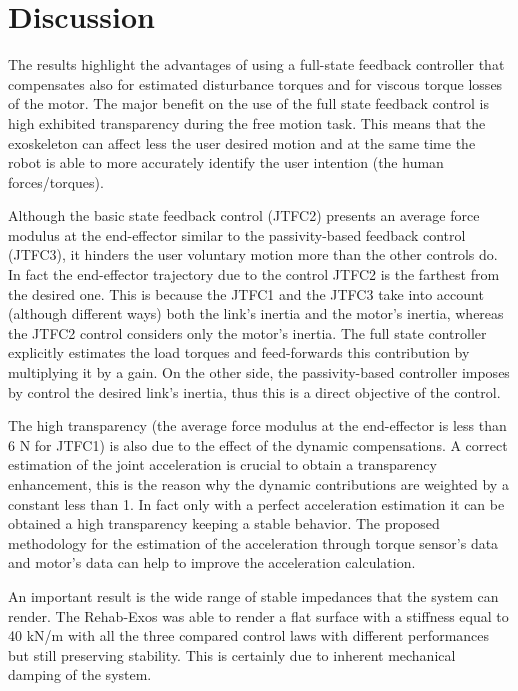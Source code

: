 
\section{Discussion} \label{sec:discussion}

The results highlight the advantages of using a full-state feedback controller that compensates also for estimated disturbance torques and for viscous torque losses of the motor. The major benefit on the use of the full state feedback control is high exhibited transparency during the free motion task. This means that the exoskeleton can affect less the user desired motion and at the same time the robot is able to more accurately identify the user intention (the human forces/torques).
\par Although the basic state feedback control (JTFC2) presents an average force modulus at the end-effector similar to the passivity-based feedback control (JTFC3), it hinders the user voluntary motion more than the other controls do. In fact the end-effector trajectory due to the control JTFC2 is the farthest from the desired one. This is because the JTFC1 and the JTFC3 take into account (although different ways) both the link's inertia and the motor's inertia, whereas the JTFC2 control considers only the motor's inertia. The full state controller explicitly estimates the load torques and feed-forwards this contribution by multiplying it by a gain. On the other side, the passivity-based controller imposes by control the desired link's inertia, thus this is a direct objective of the control.
\par The high transparency (the average force modulus at the end-effector is less than 6 N for JTFC1) is also due to the effect of the dynamic compensations. A correct estimation of the joint acceleration is crucial to obtain a transparency enhancement, this is the reason why the dynamic contributions are weighted by a constant less than 1. In fact only with a perfect acceleration estimation it can be obtained a high transparency keeping a stable behavior. The proposed methodology for the estimation of the acceleration through torque sensor's data and motor's data can help to improve the acceleration calculation.
\par An important result is the wide range of stable impedances that the system can render. The Rehab-Exos was able to render a flat surface with a stiffness equal to 40 kN/m with all the three compared control laws with different performances but still preserving stability. This is certainly due to inherent mechanical damping of the system.
